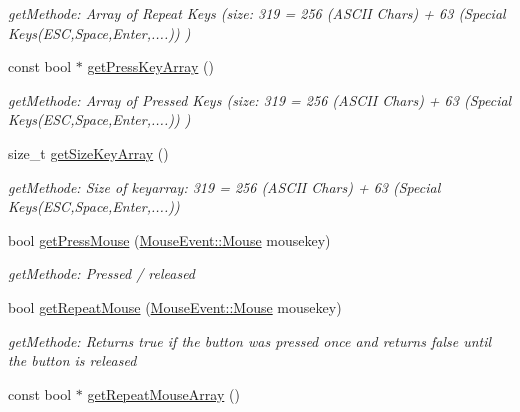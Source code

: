 \begin{DoxyCompactItemize}
\begin{DoxyCompactList}\small\item\em getMethode: Array of Repeat Keys (size: 319 = 256 (ASCII Chars) + 63 (Special Keys(ESC,Space,Enter,....)) ) \item\end{DoxyCompactList}\item 
\hypertarget{class_f2_c_1_1_input_a7a4c16d3b99c6c16ca32646db5b24586}{
const bool $\ast$ \hyperlink{class_f2_c_1_1_input_a7a4c16d3b99c6c16ca32646db5b24586}{getPressKeyArray} ()}
\label{class_f2_c_1_1_input_a7a4c16d3b99c6c16ca32646db5b24586}

\begin{DoxyCompactList}\small\item\em getMethode: Array of Pressed Keys (size: 319 = 256 (ASCII Chars) + 63 (Special Keys(ESC,Space,Enter,....)) ) \item\end{DoxyCompactList}\item 
\hypertarget{class_f2_c_1_1_input_a378b279161ad643dce3f7c5818343c29}{
size\_\-t \hyperlink{class_f2_c_1_1_input_a378b279161ad643dce3f7c5818343c29}{getSizeKeyArray} ()}
\label{class_f2_c_1_1_input_a378b279161ad643dce3f7c5818343c29}

\begin{DoxyCompactList}\small\item\em getMethode: Size of keyarray: 319 = 256 (ASCII Chars) + 63 (Special Keys(ESC,Space,Enter,....)) \item\end{DoxyCompactList}\item 
bool \hyperlink{class_f2_c_1_1_input_a9f6ddd6c1cb000651956d4778bf5ed11}{getPressMouse} (\hyperlink{namespace_f2_c_1_1_mouse_event_ad51c859ddf42f97a3c31fb60c21821a8}{MouseEvent::Mouse} mousekey)
\begin{DoxyCompactList}\small\item\em getMethode: Pressed / released \item\end{DoxyCompactList}\item 
bool \hyperlink{class_f2_c_1_1_input_ad5036f88bc9a4d42042d4d7eb04640ce}{getRepeatMouse} (\hyperlink{namespace_f2_c_1_1_mouse_event_ad51c859ddf42f97a3c31fb60c21821a8}{MouseEvent::Mouse} mousekey)
\begin{DoxyCompactList}\small\item\em getMethode: Returns true if the button was pressed once and returns false until the button is released \item\end{DoxyCompactList}\item 
\hypertarget{class_f2_c_1_1_input_acf07cf2b26970d4b7c91ddc320e14bd0}{
const bool $\ast$ \hyperlink{class_f2_c_1_1_input_acf07cf2b26970d4b7c91ddc320e14bd0}{getRepeatMouseArray} ()}
\label{class_f2_c_1_1_input_acf07cf2b26970d4b7c91ddc320e14bd0}


\end{DoxyCompactItemize}
